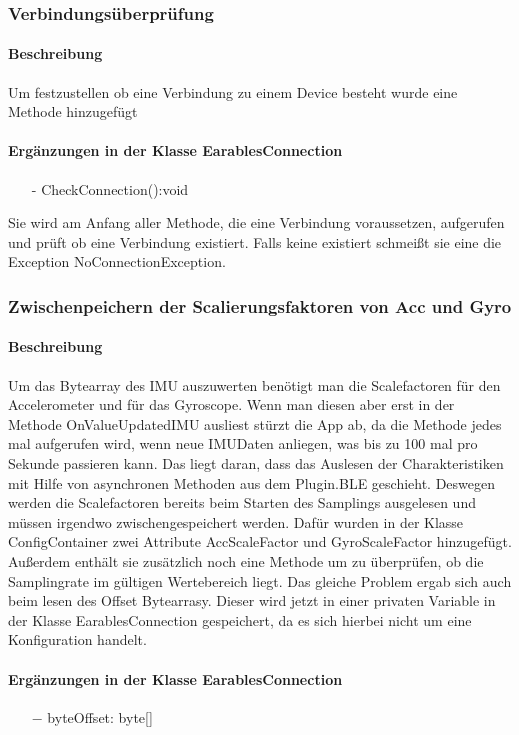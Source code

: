\documentclass[a4paper,12pt]{article}
\begin{document}
\subsubsection{Verbindungsüberprüfung}
\paragraph{Beschreibung}
Um festzustellen ob eine Verbindung zu einem Device besteht wurde eine Methode hinzugefügt
\paragraph{Ergänzungen in der Klasse EarablesConnection}
\begin{itemize}
	\item[-]  CheckConnection():void  
\end{itemize}
Sie wird am Anfang aller  Methode, die eine Verbindung voraussetzen, aufgerufen und prüft ob eine Verbindung existiert. Falls keine existiert schmeißt sie eine die Exception NoConnectionException.

\subsubsection{Zwischenpeichern der Scalierungsfaktoren von Acc und Gyro}
\paragraph{Beschreibung}
Um das Bytearray des IMU auszuwerten benötigt man die Scalefactoren für den Accelerometer und für das Gyroscope. Wenn man diesen aber erst in der Methode OnValueUpdatedIMU ausliest stürzt die App ab, da die Methode jedes mal aufgerufen wird, wenn neue IMUDaten anliegen, was bis zu 100 mal pro Sekunde passieren kann. Das liegt daran, dass das Auslesen der Charakteristiken mit Hilfe von asynchronen Methoden aus dem Plugin.BLE geschieht. Deswegen werden die Scalefactoren bereits beim Starten des Samplings ausgelesen und müssen irgendwo zwischengespeichert werden. Dafür wurden in der Klasse ConfigContainer zwei Attribute AccScaleFactor und GyroScaleFactor hinzugefügt. Außerdem enthält sie zusätzlich noch eine Methode um zu überprüfen, ob die Samplingrate im gültigen Wertebereich liegt. Das gleiche Problem ergab sich auch beim lesen des Offset Bytearrasy. Dieser wird jetzt in einer privaten Variable in der Klasse EarablesConnection gespeichert, da es sich hierbei nicht um eine Konfiguration handelt.

\paragraph{Ergänzungen in der Klasse EarablesConnection}
\begin{itemize}
	\item[$-$] byteOffset: byte[]
\end{itemize}
\end{document}
